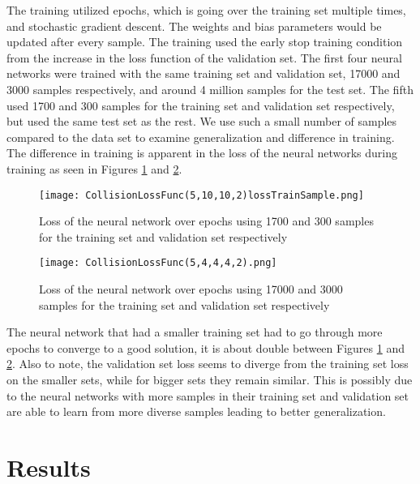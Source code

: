 \documentclass[conference]{IEEEtran}
\begin{document}
The training utilized epochs, which is going over the training set multiple times, and stochastic gradient descent. The weights and bias parameters would be updated after every sample. The training used the early stop training condition from the increase in the loss function of the validation set. The first four neural networks were trained with the same training set and validation set, 17000 and 3000 samples respectively, and around 4 million samples for the test set. The fifth used 1700 and 300 samples for the training set and validation set respectively, but used the same test set as the rest. We use such a small number of samples compared to the data set to examine generalization and difference in training. The difference in training is apparent in the loss of the neural networks during training as seen in Figures \ref{fig:lossOflowTrain} and \ref{fig:lossOfhighTrain}.

\begin{figure}[ht]
\centering
\texttt{[image: CollisionLossFunc(5,10,10,2)lossTrainSample.png]}
\caption{Loss of the neural network over epochs using 1700 and 300 samples for the training set and validation set respectively}
\label{fig:lossOflowTrain}
\end{figure}

\begin{figure}[ht]
\centering
\texttt{[image: CollisionLossFunc(5,4,4,4,2).png]}
\caption{Loss of the neural network over epochs using 17000 and 3000 samples for the training set and validation set respectively}
\label{fig:lossOfhighTrain}
\end{figure}

The neural network that had a smaller training set had to go through more epochs to converge to a good solution, it is about double between Figures \ref{fig:lossOflowTrain} and \ref{fig:lossOfhighTrain}. Also to note, the validation set loss seems to diverge from the training set loss on the smaller sets, while for bigger sets they remain similar. This is possibly due to the neural networks with more samples in their training set and validation set are able to learn from more diverse samples leading to better generalization. 

\section{Results}
\label{sec:Results}
\end{document}
